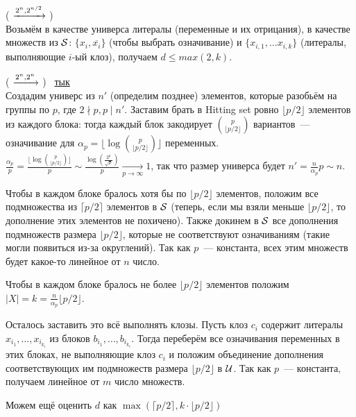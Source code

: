\begin{reduction}( $\xrightarrow{2^n, 2^{n/2}}$ )\\
Возьмём в качестве универса литералы (переменные и их отрицания), в качестве множеств из $\mathcal{S}$: $\{x_i, \overline{x_i} \}$ (чтобы выбрать означивание) и $\{ x_{i, 1}, \dots x_{i, k} \}$ (литералы, выполняющие $i$-ый клоз), получаем $d \le max(2, k)$.
\end{reduction}

\begin{reduction}( $\xrightarrow{2^n, 2^n}$ )~\cite{Cygan2016} \href{https://www.mimuw.edu.pl/~malcin/dydaktyka/2012-13/fpt/fpt_14_seth.pdf#page=2}{тык}\\
Создадим универс из $n'$ (определим позднее) элементов, которые разобьём на группы по $p$, где $2 \nmid p, p \mid n'$. Заставим брать в Hitting set ровно $\lfloor p/2 \rfloor$ элементов из каждого блока: тогда каждый блок закодирует $\binom{p}{\lfloor p/2 \rfloor}$ вариантов~--- означивание для $\alpha_p =  \lfloor \log \binom{p}{\lfloor p/2 \rfloor} \rfloor$ переменных. $\frac{\alpha_p}{p} = \frac{\lfloor \log \binom{p}{\lfloor p/2 \rfloor} \rfloor}{p} \sim \frac{\log (\frac{2^p}{\sqrt{p}})}{p} \xrightarrow[p \to \infty]{} 1$, так что размер универса будет $n' = \frac{n}{\alpha_p} p \sim n$. 

Чтобы в каждом блоке бралось хотя бы по $\lfloor p/2 \rfloor$ элементов, положим все подмножества из $\lceil p/2 \rceil$ элементов в $\mathcal{S}$ (теперь, если мы взяли меньше $\lfloor p/2 \rfloor$, то дополнение этих элементов не похичено). Также докинем в $\mathcal{S}$ все дополнения подмножеств размера $\lfloor p/2 \rfloor$, которые не соответствуют означиваниям (такие могли появиться из-за округлений). Так как $p$~--- константа, всех этим множеств будет какое-то линейное от $n$ число.

Чтобы в каждом блоке бралось не более $\lfloor p/2 \rfloor$ элементов положим $|X| = k = \frac{n}{\alpha_p} \lfloor p/2 \rfloor$.

Осталось заставить это всё выполнять клозы. Пусть клоз $c_i$ содержит литералы $x_{i_1}, \dots, x_{i_{k_i}}$ из блоков $b_{i_1}, \dots , b_{i_{k_i}}$. Тогда переберём все означивания переменных в этих блоках, не выполняющие клоз $c_i$ и положим объединение дополнения соответствующих им подмножеств размера $\lfloor p/2 \rfloor$ в $\mathcal{U}$. Так как $p$~--- константа, получаем линейное от $m$ число множеств.

Можем ещё оценить $d$ как $\max(\lceil p/2 \rceil, k \cdot \lfloor p/2 \rfloor)$

\end{reduction}

